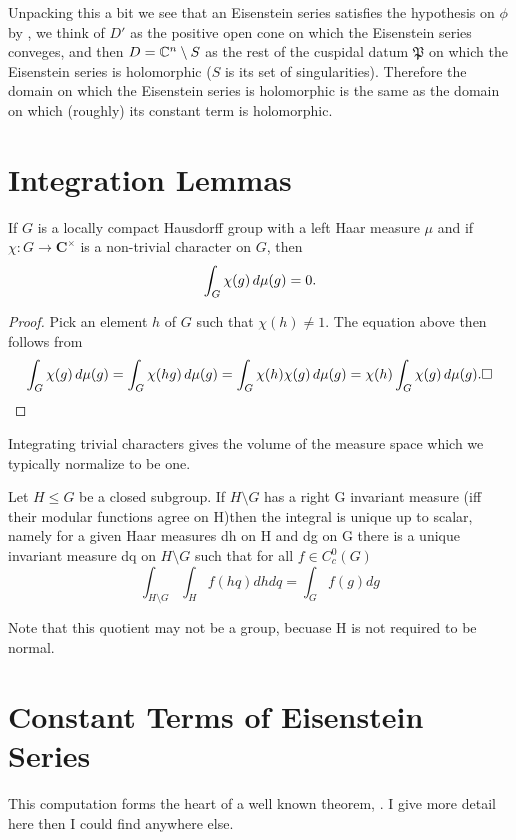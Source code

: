     Unpacking this a bit we see that an Eisenstein series satisfies the hypothesis on \(\phi\) by \cite[IV.1.9]{moeglinSpectralDecompositionEisenstein1995} , we think of \(D'\) as the positive open cone on which the Eisenstein series conveges, and then \(D = \C^n \setminus S \) as the rest of the cuspidal datum \(\mathfrak{P}\) on which the Eisenstein series is holomorphic (\(S\) is its set of singularities). Therefore the domain on which the Eisenstein series is holomorphic is the same as the domain on which (roughly) its constant term is holomorphic.

\section{Integration Lemmas}
\begin{Theorem}
	If \(G\) is a locally compact Hausdorff group with a left Haar measure \(\mu\) and if \(\chi\colon G\to \mathbf C^\times\) is a non-trivial character on \(G\), then
	\[ \int^{}_{G}\chi(g)\,d\mu(g) = 0. \]
\end{Theorem}
\begin{proof}
	Pick an element \(h\) of \(G\) such that \(\chi(h)\neq 1\).
	The equation above then follows from
	\[ \int^{}_{G}\chi(g)\,d\mu(g) = \int^{}_{G}\chi(hg)\,d\mu(g) = \int^{}_{G}\chi(h)\chi(g)\,d\mu(g) = \chi(h) \int^{}_{G}\chi(g)\,d\mu(g). \square\]
\end{proof}
Integrating trivial characters gives the volume of the measure space which we typically normalize to be one.

\begin{Theorem}
        Let \(H\leq G\) be a closed subgroup. If \(H\setminus G\) has a right G invariant measure (iff their modular functions agree on H)then the integral is unique up to scalar, namely for a given Haar measures dh on H and dg on G there is a unique invariant measure dq on \(H\setminus G\) such that for all \(f\in C_c^0(G)\)
        \[\int_{H\setminus G}\int_H f(hq)dhdq = \int_G f(g) dg\]
    \end{Theorem}
    Note that this quotient may not be a group, becuase H is not required to be normal.

\section{Constant Terms of Eisenstein Series}
This computation forms the heart of a well known theorem, \cite[Prop 10.4.2]{getzIntroductionAutomorphicRepresentations2024}\cite[II.1.7]{moeglinSpectralDecompositionEisenstein1995}\cite[6.2]{shahidiEisensteinSeriesAutomorphic2010}. I give more detail here then I could find anywhere else. 

